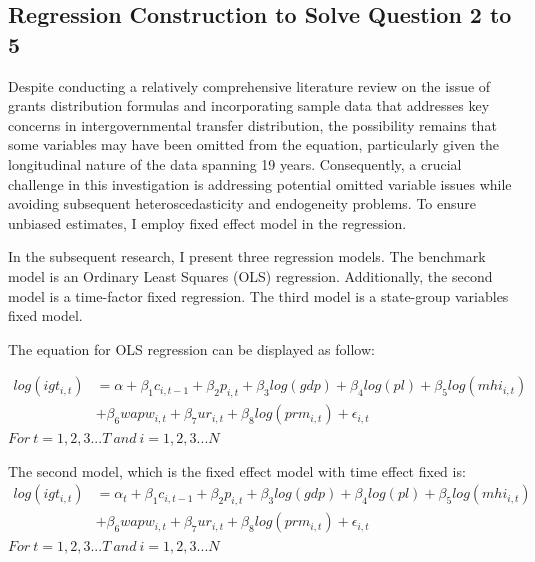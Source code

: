 \documentclass[man]{apa7}
\begin{document}

\subsection{Regression Construction to Solve Question 2 to 5}

Despite conducting a relatively comprehensive literature review on the issue of grants distribution formulas and incorporating sample data that addresses key concerns in intergovernmental transfer distribution, the possibility remains that some variables may have been omitted from the equation, particularly given the longitudinal nature of the data spanning 19 years. Consequently, a crucial challenge in this investigation is addressing potential omitted variable issues while avoiding subsequent heteroscedasticity and endogeneity problems. To ensure unbiased estimates, I employ fixed effect model in the regression.

In the subsequent research, I present three regression models. The benchmark model is an Ordinary Least Squares (OLS) regression. Additionally, the second model is a time-factor fixed regression. The third model is a state-group variables fixed model.


The equation for OLS regression can be displayed as follow:

\begin{equation}
  \begin{split}
    log(igt_{i,t}) & = \alpha + \beta_1 c_{i,t-1} + \beta_2 p_{i,t} + \beta_3 log(gdp) + \beta_4 log(pl) + \beta_5 log(mhi_{i,t}) \\
    & + \beta_6 wapw_{i,t} + \beta_7 ur_{i,t} +\beta_8 log(prm_{i,t}) + \epsilon_{i,t}
  \end{split}
\end{equation}
$For\ t = 1, 2, 3...T\ and\ i = 1, 2, 3...N $

The second model, which is the fixed effect model with time effect fixed is:
\begin{equation}
  \begin{split}
    log(igt_{i,t}) & = \alpha_t + \beta_1 c_{i,t-1} + \beta_2 p_{i,t} + \beta_3 log(gdp) + \beta_4 log(pl) + \beta_5 log(mhi_{i,t}) \\
    &+ \beta_6 wapw_{i,t} + \beta_7 ur_{i,t} +\beta_8 log(prm_{i,t}) + \epsilon_{i,t}
  \end{split}
\end{equation}
$For\ t = 1, 2, 3...T\ and\ i = 1, 2, 3...N $
\end{document}
